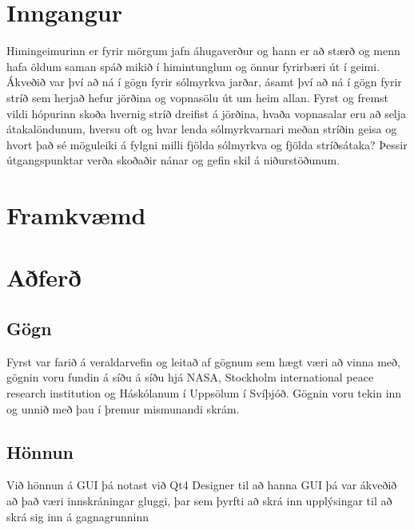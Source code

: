 \documentclass[12pt, git, final]{rureport}
\begin{document}
\maketitle  %


%
\section{Inngangur} %
Himingeimurinn er fyrir mörgum jafn áhugaverður og hann er að stærð og menn hafa öldum saman spáð mikið í himintunglum og önnur fyrirbæri út í geimi. Ákveðið var því að ná í gögn fyrir sólmyrkva jarðar, ásamt því að ná í gögn fyrir stríð  sem herjað hefur jörðina og vopnasölu út um heim allan. Fyrst og fremst vildi hópurinn skoða hvernig stríð dreifist á jörðina, hvaða vopnasalar eru að selja átakalöndunum, hversu oft og hvar lenda sólmyrkvarnari meðan stríðin geisa og hvort það sé möguleiki á fylgni milli fjölda sólmyrkva og fjölda stríðsátaka? Þessir útgangspunktar verða skoðaðir nánar og gefin skil á niðurstöðunum. 
\section{Framkvæmd}

\section{Aðferð}
\subsection{Gögn}
Fyrst var farið á veraldarvefin og leitað af gögnum sem hægt væri að vinna með, gögnin voru fundin á síðu á síðu hjá NASA\cite{Eclipse}, Stockholm international peace research institution\cite{weapon} og Háskólanum í Uppsölum í Svíþjóð\cite{conflict}. Gögnin voru tekin inn og unnið með þau í þremur mismunandi skrám.
\subsection{Hönnun}
Við hönnun á GUI þá notast  við Qt4 Designer \cite{qt4} til að hanna GUI þá var ákveðið að það væri innskráningar gluggi, þar sem þyrfti að skrá inn upplýsingar til að skrá sig inn á gagnagrunninn
\end{document}
